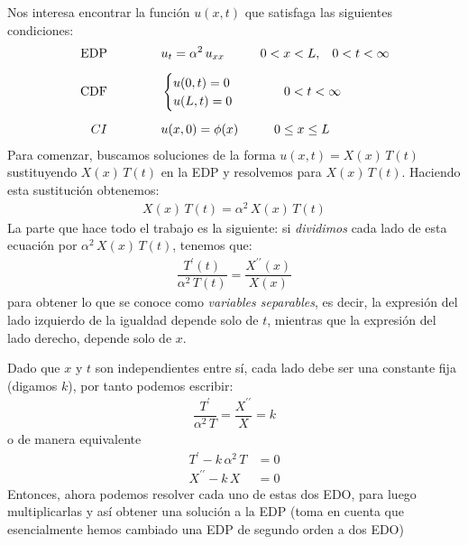 Nos interesa encontrar la función $u(x, t)$ que satisfaga las siguientes condiciones:
\begin{align*}
\mbox{EDP} \hspace{1.5cm} &u_{t} = \alpha^{2} \, u_{xx} \hspace{1cm} 0 < x < L, \hspace{0.3cm} 0 < t < \infty \\[0.5em] 
\mbox{CDF} \hspace{1.5cm} &\begin{cases}
    u(0, t) = 0 \\
    u(L, t) = 0
    \end{cases}
    \hspace{1cm}
    0 < t < \infty \\[0.5em]
CI \hspace{1.5cm} & u(x, 0) = \phi (x) \hspace{1cm} 0 \leq x \leq L
\end{align*}
Para comenzar, buscamos soluciones de la forma $u (x, t) = X(x) \, T (t)$ sustituyendo $X (x) \, T (t)$ en la EDP y resolvemos para  $X (x) \, T (t)$. Haciendo esta sustitución obtenemos:
\begin{align*}
X(x) \, T (t) = \alpha^{2} \, X (x) \, T(t)
\end{align*}
La parte que hace todo el trabajo es la siguiente: si \emph{dividimos} cada lado de esta ecuación por $\alpha^{2} \, X(x) \, T(t)$, tenemos que:
\begin{align*}
\dfrac{T^{\prime} (t)}{\alpha^{2} \, T(t)} = \dfrac{X^{\prime \prime} (x)}{X(x)}
\end{align*}
para obtener lo que se conoce como \emph{variables separables}, es decir, la expresión del lado izquierdo de la igualdad depende solo de $t$, mientras que la expresión del lado derecho, depende solo de $x$.
\par
Dado que $x$ y $t$ son independientes entre sí, cada lado debe ser una constante fija (digamos $k$),  por tanto podemos escribir:
\begin{align*}
\dfrac{T^{\prime}}{\alpha^{2} \, T} = \dfrac{X^{\prime \prime}}{X} = k
\end{align*}
o de manera equivalente
\begin{align*}
T^{\prime} - k \, \alpha^{2} \, T &= 0 \\[0.5em]
X^{\prime \prime} - k \, X &= 0
\end{align*}
Entonces, ahora podemos resolver cada uno de estas dos EDO, para luego multiplicarlas y así obtener una solución a la EDP (toma en cuenta que esencialmente hemos cambiado una EDP de segundo orden a dos EDO)
